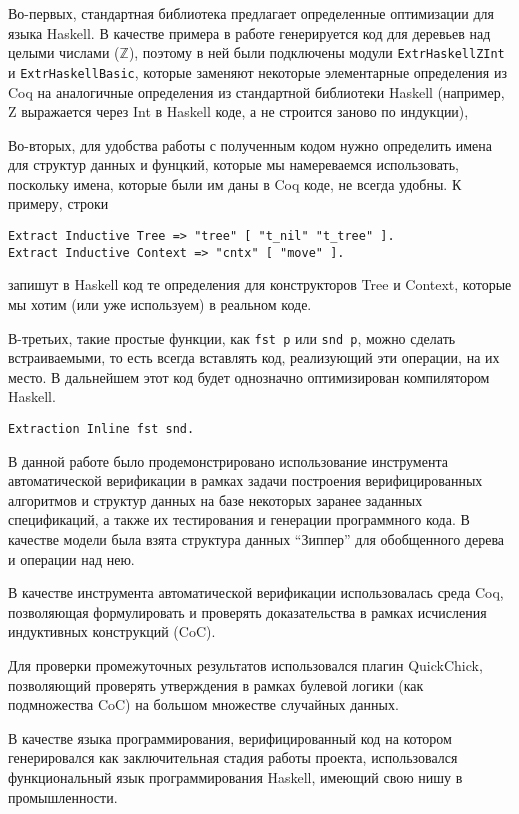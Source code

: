 Во-первых, стандартная библиотека предлагает определенные оптимизации для языка Haskell. В качестве примера в работе генерируется код для деревьев над целыми числами ($\mathbb{Z}$), поэтому в ней были подключены модули \texttt{ExtrHaskellZInt} и \texttt{ExtrHaskellBasic}, которые заменяют некоторые элементарные определения из Coq на аналогичные определения из стандартной библиотеки Haskell (например, Z выражается через Int в Haskell коде, а не строится заново по индукции),

Во-вторых, для удобства работы с полученным кодом нужно определить имена для структур данных и фунцкий, которые мы намереваемся использовать, поскольку имена, которые были им даны в Coq коде, не всегда удобны. К примеру, строки
\begin{Verbatim}[fontsize=\small]
Extract Inductive Tree => "tree" [ "t_nil" "t_tree" ].
Extract Inductive Context => "cntx" [ "move" ].
\end{Verbatim}
запишут в Haskell код те определения для конструкторов Tree и Context, которые мы хотим (или уже используем) в реальном коде. 

В-третьих, такие простые функции, как \texttt{fst p} или \texttt{snd p}, можно сделать встраиваемыми, то есть всегда вставлять код, реализующий эти операции, на их место. В дальнейшем этот код будет однозначно оптимизирован компилятором Haskell.
\begin{Verbatim}[fontsize=\small]
Extraction Inline fst snd.
\end{Verbatim}

\newpage

\Conc

В данной работе было продемонстрировано использование инструмента автоматической верификации в рамках задачи построения верифицированных алгоритмов и структур данных на базе некоторых заранее заданных спецификаций, а также их тестирования и генерации программного кода. В качестве модели была взята структура данных ``Зиппер'' для обобщенного дерева и операции над нею.

В качестве инструмента автоматической верификации использовалась среда Coq, позволяющая формулировать и проверять доказательства в рамках исчисления индуктивных конструкций (CoC).

Для проверки промежуточных результатов использовался плагин QuickChick, позволяющий проверять утверждения в рамках булевой логики (как подмножества CoC) на большом множестве случайных данных.

В качестве языка программирования, верифицированный код на котором генерировался как заключительная стадия работы проекта, использовался функциональный язык программирования Haskell, имеющий свою нишу в промышленности.

